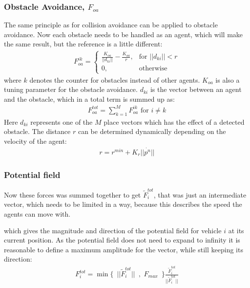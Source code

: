 \subsubsection{Obstacle Avoidance, $F_{oa}$}
The same principle as for collision avoidance can be applied to
obstacle avoidance. Now each obstacle needs to be handled as an agent,
which will make the same result, but the reference is a little
different:
\begin{align}
    F_{oa}^{ik}= 
\begin{cases}
    \frac{K_{oa}}{||d_{ki}||}-\frac{K_{oa}}{r},& \text{for } ||d_{ki}||<r\\
    0,              & \text{otherwise}
\end{cases}
\end{align}
where $k$ denotes the counter for obstacles instead of other agents.
$K_{oa}$ is also a tuning parameter for the obstacle avoidance.
$d_{ki}$ is the vector between an agent and the obstacle, which in a
total term is summed up as:
\begin{align}
F_{oa}^{tot} = \sum\limits_{k=1}^MF_{oa}^{ik} \text{ for } i\neq k
\end{align}
Here $d_{ki}$ represents one of the $M$ place vectors which has the
effect of a detected obstacle.  The distance $r$ can be determined
dynamically depending on the velocity of the agent:
\begin{align}
r = r^{min} + K_r||\dot{p^n}||
\end{align}

\subsubsection{Potential field}
Now these forces was summed together to get
$\tilde{F}_i^{tot}$, that was just an intermediate vector, which needs
to be limited in a way, because this describes the speed the agents
can move with.

which gives the magnitude and direction of the
potential field for vehicle $i$ at its current position. As the
potential field does not need to expand to infinity it is reasonable
to define a maximum amplitude for the vector, while still keeping its
direction:
\begin{align}
	F_i^{tot} = \min\{\,\,\,||\tilde{F}_i^{tot}||\,\,\,,\,\,F_{max}\,\,\,\}\frac{\tilde{F}_i^{tot}}{||\tilde{F}_i^{tot}||}
\end{align}


